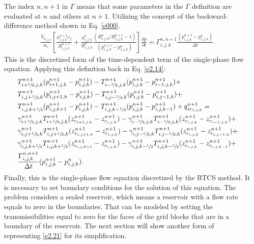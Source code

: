The index $n,n+1$ in $\Gamma$ means that some parameters in the $\Gamma$ definition are evaluated at $n$ and others at $n+1$. Utilizing the concept of the backward-difference method shown in Eq. \ref{e000}. 
	\begin{multline}
	\label{eqGamma2}
	\frac {V_{b_{i,j,k}}}{\alpha_c} \left[ \frac{\phi^{n+1}_{i,j,k} c_f}{B^{n+1}_{i,j,k}} + \frac{\phi^n_{i,j,k}}{B^n_{i,j,k}} \frac{ \left( B^n_{i,j,k}/B^{n+1}_{i,j,k}-1\right) } { (p^{n+1}_{i,j,k} - p^{n}_{i,j,k}) } \right] \frac{\partial p}{\partial t} = \Gamma^{n,n+1}_{i,j,k} \frac{(p^{n+1}_{i,j,k} - p^{n}_{i,j,k})}{\Delta t}.
	\end{multline}
This is the discretized form of the time-dependent term of the single-phase flow equation. Applying this definition back in Eq. \ref{e2.14}:
	\begin{align}\nonumber
	\label{e2.21}
	& T^{n+1}_{i+\sfrac{1}{2},j,k}(p^{n+1}_{i+1,j,k}-p^{n+1}_{i,j,k}) - T^{n+1}_{i-\sfrac{1}{2},j,k}(p^{n+1}_{i,j,k}-p^{n+1}_{i-1,j,k}) \nonumber +\\ &
	T^{n+1}_{i,j+\sfrac{1}{2},k}(p^{n+1}_{i,j+1,k}-p^{n+1}_{i,j,k}) - T^{n+1}_{i,j-\sfrac{1}{2},k}(p^{n+1}_{i,j,k}-p^{n+1}_{i,j-1,k}) \nonumber +\\ &
	T^{n+1}_{i,j,k+\sfrac{1}{2}}(p^{n+1}_{i,j,k+1}-p^{n+1}_{i,j,k}) - T^{n+1}_{i,j,k-\sfrac{1}{2}}(p^{n+1}_{i,j,k}-p^{n+1}_{i,j,k-1})
	\nonumber +
	q^{n+1}_{sc_{i,j,k}} =\\ &
	\gamma^{n+1}_{i+\sfrac{1}{2},j,k} T^{n+1}_{i+\sfrac{1}{2},j,k}(z^{n+1}_{r_{i+1,j,k}}-z^{n+1}_{r_{i,j,k}}) - \gamma^{n+1}_{i-\sfrac{1}{2},j,k} T^{n+1}_{i-\sfrac{1}{2},j,k}(z^{n+1}_{r_{i,j,k}}-z^{n+1}_{r_{i-1,j,k}}) \nonumber +\\ &
	\gamma^{n+1}_{i,j+\sfrac{1}{2},k} T^{n+1}_{i,j+\sfrac{1}{2},k}(z^{n+1}_{r_{i,j+1,k}}-z^{n+1}_{r_{i,j,k}}) - \gamma^{n+1}_{i,j-\sfrac{1}{2},k} T^{n+1}_{i,j-\sfrac{1}{2},k}(z^{n+1}_{r_{i,j,k}}-z^{n+1}_{r_{i,j-1,k}}) \nonumber +\\ &
	\gamma^{n+1}_{i,j,k+\sfrac{1}{2}} T^{n+1}_{i,j,k+\sfrac{1}{2}}(z^{n+1}_{r_{i,j,k+1}}-z^{n+1}_{r_{i,j,k}}) - \gamma^{n+1}_{i,j,k-\sfrac{1}{2}} T^{n+1}_{i,j,k-\sfrac{1}{2}}(z^{n+1}_{r_{i,j,k}}-z^{n+1}_{r_{i,j,k-1}}) \nonumber +\\ &
	\frac{\Gamma_{i,j,k}^{n,n+1}}{\Delta t} (p_{i,j,k}^{n+1}-p_{i,j,k}^n).
	\end{align}
Finally, this is the single-phase flow equation discretized by the BTCS method. It is necessary to set boundary conditions for the solution of this equation. The problem considers a sealed reservoir, which means a reservoir with a flow rate equals to zero in the boundaries. That can be modeled by setting the transmissibilities equal to zero for the faces of the grid blocks that are in a boundary of the reservoir. The next section will show another form of representing \ref{e2.21} for its simplification.	

